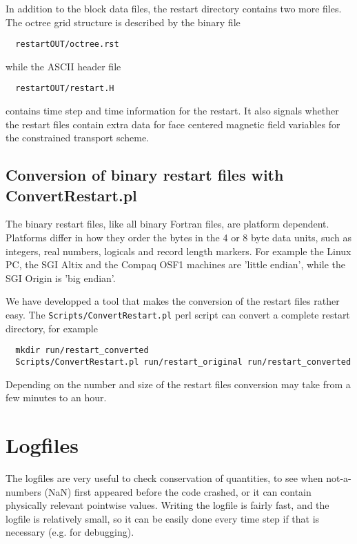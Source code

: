 In addition to the block data files, the restart directory contains two
more files. The octree grid structure is described by the binary file
\begin{verbatim}
  restartOUT/octree.rst
\end{verbatim}
while the ASCII header file
\begin{verbatim}
  restartOUT/restart.H
\end{verbatim}
contains time step and time information for the restart. It also signals
whether the restart files contain extra data for face centered 
magnetic field variables for the constrained transport scheme.

\subsection{Conversion of binary restart files with ConvertRestart.pl}

The binary restart files, like all binary Fortran files, 
are platform dependent. Platforms differ in how they order the
bytes in the 4 or 8 byte data units, such as integers, real numbers,
logicals and record length markers. For example the Linux PC, the
SGI Altix and the Compaq OSF1 machines are 'little endian', 
while the SGI Origin is 'big endian'. 

We have developped a tool that makes the conversion of the restart files 
rather easy. The {\tt Scripts/ConvertRestart.pl} perl script can convert a 
complete restart directory, for example
\begin{verbatim}
  mkdir run/restart_converted
  Scripts/ConvertRestart.pl run/restart_original run/restart_converted
\end{verbatim}
Depending on the number and size of the restart files conversion may take 
from a few minutes to an hour.

\section{Logfiles \label{section:logfiles}}

The logfiles are very useful to check conservation of quantities,
to see when not-a-numbers (NaN) first appeared before the code crashed,
or it can contain physically relevant pointwise values. Writing
the logfile is fairly fast, and the logfile is relatively small,
so it can be easily done every time step if that is necessary 
(e.g. for debugging).

